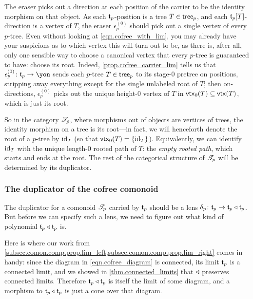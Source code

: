 \documentclass[Book-Poly]{subfiles}
\begin{document}
The eraser picks out a direction at each position of the carrier to be the identity morphism on that object.
As each $\mathfrak{t}_p$-position is a tree $T\in\mathsf{tree}_p$, and each $\mathfrak{t}_p[T]$-direction is a vertex of $T$, the eraser $\epsilon^{(0)}_p$ should pick out a single vertex of every $p$-tree.
Even without looking at \eqref{eqn.cofree_with_lim}, you may already have your suspicions as to which vertex this will turn out to be, as there is, after all, only one sensible way to choose a canonical vertex that every $p$-tree is guaranteed to have: choose its root.
Indeed, \cref{prop.cofree_carrier_lim} tells us that $\epsilon^{(0)}_p\colon\ema{t}_p\to\yon$ sends each $p$-tree $T\in\mathsf{tree}_p$ to its stage-$0$ pretree on positions, stripping away everything except for the single unlabeled root of $T$; then on-directions, $\epsilon^{(0)}_p$ picks out the unique height-$0$ vertex of $T$ in $\mathsf{vtx}_0(T)\subseteq\mathsf{vtx}(T)$, which is just its root.

So in the category $\mathscr{T}_{p}$, where morphisms out of objects are vertices of trees, the identity morphism on a tree is its root---in fact, we will henceforth denote the root of a $p$-tree by $\mathrm{id}_T$ (so that $\mathsf{vtx}_0(T)=\{\mathrm{id}_T\}$).
Equivalently, we can identify $\mathrm{id}_T$ with the unique length-$0$ rooted path of $T$: the \emph{empty rooted path}, which starts and ends at the root.
The rest of the categorical structure of $\mathscr{T}_{p}$ will be determined by its duplicator.

\subsubsection{The duplicator of the cofree comonoid}

The duplicator for a comonoid $\mathscr{T}_{p}$ carried by $\mathfrak{t}_p$ should be a lens $\delta_p\colon\mathfrak{t}_p\to\mathfrak{t}_p\mathbin{\triangleleft}\mathfrak{t}_p$.
But before we can specify such a lens, we need to figure out what kind of polynomial $\mathfrak{t}_p\mathbin{\triangleleft}\mathfrak{t}_p$ is.

Here is where our work from \cref{subsec.comon.comp.prop.lim_left,subsec.comon.comp.prop.lim_right} comes in handy: since the diagram in \eqref{eqn.cofree_diagram} is connected, its limit $\mathfrak{t}_p$ is a connected limit, and we showed in \cref{thm.connected_limits} that $\mathbin{\triangleleft}$ preserves connected limits.
Therefore $\mathfrak{t}_p\mathbin{\triangleleft}\mathfrak{t}_p$ is itself the limit of some diagram, and a morphism to $\mathfrak{t}_p\mathbin{\triangleleft}\mathfrak{t}_p$ is just a cone over that diagram.
\end{document}
